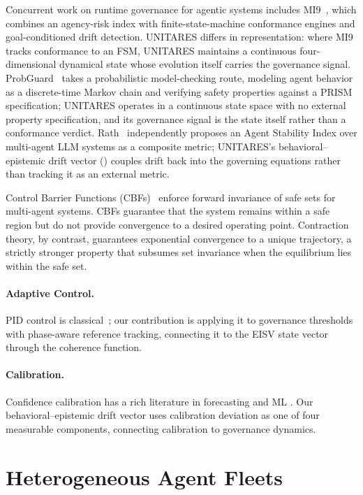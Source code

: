 \documentclass[11pt,twocolumn]{article}
\begin{document}
Concurrent work on runtime governance for agentic systems includes
MI9~\cite{wang2025mi9}, which combines an agency-risk index with
finite-state-machine conformance engines and goal-conditioned drift
detection. UNITARES differs in representation: where MI9 tracks
conformance to an FSM, UNITARES maintains a continuous four-dimensional
dynamical state whose evolution itself carries the governance signal.
ProbGuard~\cite{wang2025probguard} takes a probabilistic
model-checking route, modeling agent behavior as a discrete-time
Markov chain and verifying safety properties against a PRISM
specification; UNITARES operates in a continuous state space
with no external property specification, and its governance signal
is the state itself rather than a conformance verdict.
Rath~\cite{rath2026agentdrift} independently proposes an Agent
Stability Index over multi-agent LLM systems as a composite metric;
UNITARES's behavioral--epistemic drift vector () couples
drift back into the governing equations rather than tracking it as an
external metric.

Control Barrier Functions (CBFs)~\cite{ames2019control} enforce
forward invariance of safe sets for multi-agent systems. CBFs
guarantee that the system remains within a safe region but do not
provide convergence to a desired operating point. Contraction theory,
by contrast, guarantees exponential convergence to a unique
trajectory, a strictly stronger property that subsumes set invariance
when the equilibrium lies within the safe set.

\paragraph{Adaptive Control.}
PID control is classical~\cite{astrom2008feedback}; our contribution
is applying it to governance thresholds with phase-aware reference
tracking, connecting it to the EISV state vector through the
coherence function.

\paragraph{Calibration.}
Confidence calibration has a rich literature in forecasting and ML
\cite{guo2017calibration,niculescu2005predicting}. Our behavioral--epistemic drift
vector uses calibration deviation as one of four measurable components,
connecting calibration to governance dynamics.

\section{Heterogeneous Agent Fleets}
\label{sec:heterogeneity}
\end{document}
